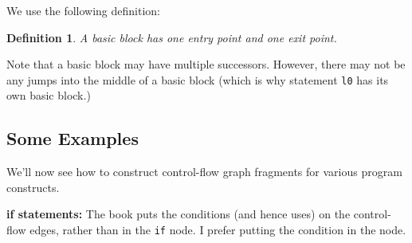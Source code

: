 \documentclass[11pt]{article}
\newtheorem{defn}{Definition}
\begin{document}
We use the following definition:
\begin{defn}
A basic block has one entry point and one exit point.
\end{defn}
Note that a basic block may have multiple successors. However, there 
may not be any jumps into the middle of a basic block (which is
why statement {\tt l0} has its own basic block.)

\subsection*{Some Examples} We'll now see how to construct
control-flow graph fragments for various program constructs.

{\bf if statements:} The book puts the conditions
(and hence uses) on the control-flow edges, rather than in the 
{\tt if} node. I prefer putting the condition in the node.
\end{document}
